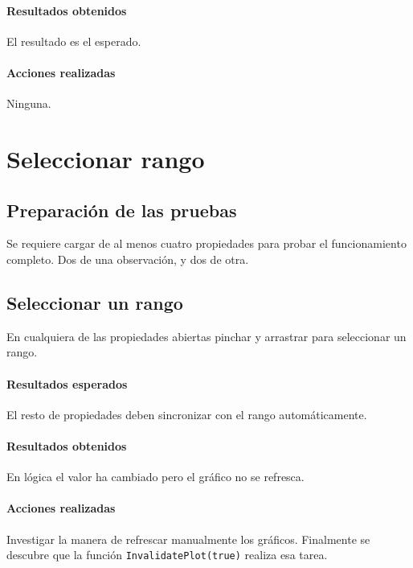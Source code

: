 \paragraph{Resultados obtenidos}
El resultado es el esperado.

\paragraph{Acciones realizadas}
Ninguna.

\section{Seleccionar rango}
\subsection{Preparaci\'on de las pruebas}
Se requiere cargar de al menos cuatro propiedades para probar el funcionamiento
completo. Dos de una observaci\'on, y dos de otra.

\subsection{Seleccionar un rango}
En cualquiera de las propiedades abiertas pinchar y arrastrar para seleccionar
un rango.

\paragraph{Resultados esperados}
El resto de propiedades deben sincronizar con el rango autom\'aticamente.

\paragraph{Resultados obtenidos}
En l\'ogica el valor ha cambiado pero el gr\'afico no se refresca.

\paragraph{Acciones realizadas}
Investigar la manera de refrescar manualmente los gr\'aficos.
Finalmente se descubre que la funci\'on \texttt{InvalidatePlot(true)} realiza
esa tarea.